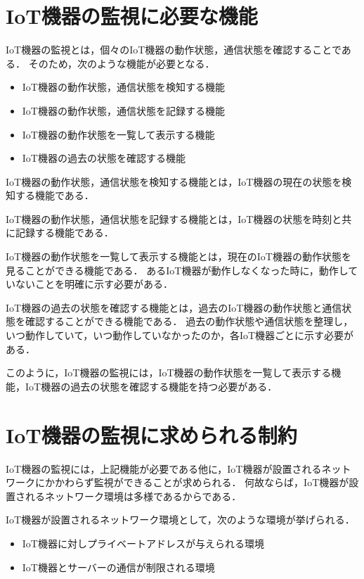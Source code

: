 \section{IoT機器の監視に必要な機能}%
IoT機器の監視とは，個々のIoT機器の動作状態，通信状態を確認することである．
そのため，次のような機能が必要となる．
\begin{itemize}
	\item IoT機器の動作状態，通信状態を検知する機能
	\item IoT機器の動作状態，通信状態を記録する機能
	\item IoT機器の動作状態を一覧して表示する機能
	\item IoT機器の過去の状態を確認する機能
\end{itemize}

IoT機器の動作状態，通信状態を検知する機能とは，IoT機器の現在の状態を検知する機能である．

IoT機器の動作状態，通信状態を記録する機能とは，IoT機器の状態を時刻と共に記録する機能である．

IoT機器の動作状態を一覧して表示する機能とは，現在のIoT機器の動作状態を見ることができる機能である．
あるIoT機器が動作しなくなった時に，動作していないことを明確に示す必要がある．
\medskip

IoT機器の過去の状態を確認する機能とは，過去のIoT機器の動作状態と通信状態を確認することができる機能である．
過去の動作状態や通信状態を整理し，いつ動作していて，いつ動作していなかったのか，各IoT機器ごとに示す必要がある．
\medskip

このように，IoT機器の監視には，IoT機器の動作状態を一覧して表示する機能，IoT機器の過去の状態を確認する機能を持つ必要がある．

\section{IoT機器の監視に求められる制約}%
IoT機器の監視には，上記機能が必要である他に，IoT機器が設置されるネットワークにかかわらず監視ができることが求められる．
何故ならば，IoT機器が設置されるネットワーク環境は多様であるからである．
\medskip

IoT機器が設置されるネットワーク環境として，次のような環境が挙げられる．
\begin{itemize}
	\item IoT機器に対しプライベートアドレスが与えられる環境
	\item IoT機器とサーバーの通信が制限される環境
\end{itemize}

